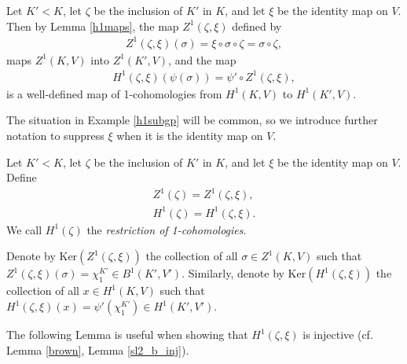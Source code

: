 \begin{example} \label{h1subgp}
	Let $K' < K$, let $\zeta$ be the inclusion of $K'$ in $K$, and let $\xi$ be the identity map on $V$. Then by Lemma \ref{h1maps}, the map $Z^1(\zeta, \xi)$ defined by
\begin{align*}
	Z^1(\zeta, \xi)(\sigma) = \xi \circ \sigma \circ \zeta = \sigma \circ \zeta,
\end{align*}
maps $Z^1(K, V)$ into $Z^1(K', V)$, and the map
\begin{align*}
	H^1(\zeta, \xi)(\psi(\sigma)) = \psi' \circ Z^1(\zeta, \xi),
\end{align*}
is a well-defined map of 1-cohomologies from $H^1(K, V)$ to $H^1(K', V)$. 
\end{example}

The situation in Example \ref{h1subgp} will be common, so we introduce further notation to suppress $\xi$ when it is the identity map on $V$.
\begin{definition} Let $K' < K$, let $\zeta$ be the inclusion of $K'$ in $K$, and let $\xi$ be the identity map on $V$. Define
\begin{align*}
	Z^1(\zeta) = Z^1(\zeta, \xi), \\
	H^1(\zeta) = H^1(\zeta, \xi).
\end{align*}
We call $H^1(\zeta)$ the \emph{restriction of 1-cohomologies}.
\end{definition}

\begin{definition} Denote by $\mathrm{Ker}\left(Z^1(\zeta, \xi)\right)$ the collection of all $\sigma\in Z^1(K, V)$ such that $Z^1(\zeta, \xi)(\sigma) = \chi^{K'}_1 \in B^1(K', V')$. Similarly, denote by $\mathrm{Ker}\left(H^1(\zeta, \xi)\right)$ the collection of all $x \in H^1(K, V)$ such that $H^1(\zeta, \xi)(x) = \psi'\left(\chi^{K'}_1\right)\in H^1(K', V')$.
\end{definition}

The following Lemma is useful when showing that $H^1(\zeta, \xi)$ is injective (cf. Lemma \ref{brown}, Lemma \ref{sl2_b_inj}).

